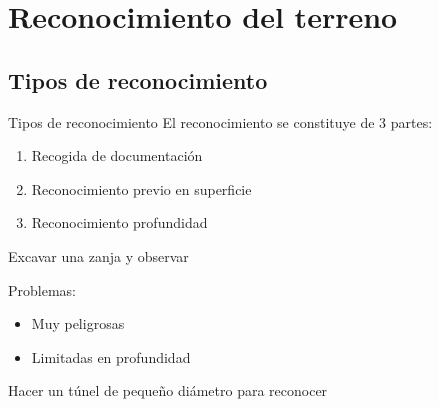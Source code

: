 \section{Reconocimiento del terreno} %
\label{sec:reconocimiento_del_terreno}

\subsection{Tipos de reconocimiento} %
\label{sub:tipos_de_reconocimiento}

\begin{mybox}{Tipos de reconocimiento}
	El reconocimiento se constituye de 3 partes:
	\begin{enumerate}
		\item Recogida de documentación
		\item Reconocimiento previo en superficie
		\item Reconocimiento profundidad
	\end{enumerate}

	\begin{ldef}[Catas]
		Excavar una zanja y observar
	\end{ldef}
	Problemas:
	\begin{itemize}
		\item Muy peligrosas
		\item Limitadas en profundidad
	\end{itemize}

	\begin{ldef}
		Hacer un túnel de pequeño diámetro para reconocer
	\end{ldef}


\end{mybox}
